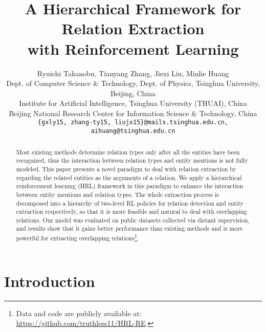 \documentclass[letterpaper]{article} \usepackage{aaai19}  \usepackage{times}  \usepackage{helvet}  \usepackage{courier}  \usepackage{url}  \usepackage{graphicx}  \frenchspacing  \setlength{\pdfpagewidth}{8.5in}  \setlength{\pdfpageheight}{11in}  \usepackage{amsfonts}
\theoremstyle{definition}
\begin{document}
\title{A Hierarchical Framework for Relation Extraction \\
    with Reinforcement Learning}
\author{Ryuichi Takanobu\footnotemark[1],
        Tianyang Zhang\footnotemark[1],
        Jiexi Liu\footnotemark[1],
        Minlie Huang\footnotemark[2]\\
   Dept. of Computer Science \& Technology,  Dept. of Physics, Tsinghua University, Beijing, China \\ 
   Institute for Artificial Intelligence, Tsinghua University (THUAI), China \\
   Beijing National Research Center for Information Science \& Technology, China \\
  {\tt \{gxly15, zhang-ty15, liujx15\}@mails.tsinghua.edu.cn, aihuang@tsinghua.edu.cn}\\
}
\maketitle
\renewcommand{\thefootnote}{\fnsymbol{footnote}}
\renewcommand{\thefootnote}{\arabic{footnote}}
\begin{abstract}
  Most existing methods determine relation types only after all the entities have been recognized, thus the interaction between relation types and entity mentions is not fully modeled. This paper presents a novel paradigm to deal with relation extraction by regarding the related entities as the arguments of a relation. We apply a hierarchical reinforcement learning (HRL) framework in this paradigm to enhance the interaction between entity mentions and relation types. The whole extraction process is decomposed into a hierarchy of two-level RL policies for relation detection and entity extraction respectively, so that it is more feasible and natural to deal with overlapping relations. Our model was evaluated on public datasets collected via distant supervision, and results show that it gains better performance than existing methods and is more powerful for extracting overlapping relations\footnote{Data and code are publicly available at: \url{https://github.com/truthless11/HRL-RE}.}.
\end{abstract}

\section{Introduction}
\end{document}
